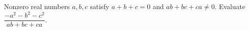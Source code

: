 Nonzero real numbers $a,b,c$ satisfy $a+b+c=0$ and $ab+bc+ca\ne0$. Evaluate $\dfrac{-a^2-b^2-c^2}{ab+bc+ca}$.

